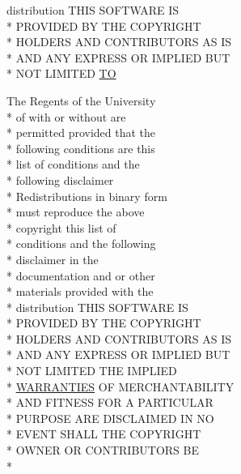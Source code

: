 \begin{DoxyCompactItemize}
distribution T\+H\+I\+S S\+O\+F\+T\+W\+A\+R\+E I\+S \\*
P\+R\+O\+V\+I\+D\+E\+D B\+Y T\+H\+E C\+O\+P\+Y\+R\+I\+G\+H\+T \\*
H\+O\+L\+D\+E\+R\+S A\+N\+D C\+O\+N\+T\+R\+I\+B\+U\+T\+O\+R\+S A\+S I\+S \\*
A\+N\+D A\+N\+Y E\+X\+P\+R\+E\+S\+S O\+R I\+M\+P\+L\+I\+E\+D B\+U\+T \\*
N\+O\+T L\+I\+M\+I\+T\+E\+D \hyperlink{_l_i_c_e_n_s_e_a57f5e47bdbaa2a03fa7895d50ba5e2d3}{T\+O}
\item 
The Regents of the University \\*
of with or without are \\*
permitted provided that the \\*
following conditions are this \\*
list of conditions and the \\*
following disclaimer \\*
Redistributions in binary form \\*
must reproduce the above \\*
copyright this list of \\*
conditions and the following \\*
disclaimer in the \\*
documentation and or other \\*
materials provided with the \\*
distribution T\+H\+I\+S S\+O\+F\+T\+W\+A\+R\+E I\+S \\*
P\+R\+O\+V\+I\+D\+E\+D B\+Y T\+H\+E C\+O\+P\+Y\+R\+I\+G\+H\+T \\*
H\+O\+L\+D\+E\+R\+S A\+N\+D C\+O\+N\+T\+R\+I\+B\+U\+T\+O\+R\+S A\+S I\+S \\*
A\+N\+D A\+N\+Y E\+X\+P\+R\+E\+S\+S O\+R I\+M\+P\+L\+I\+E\+D B\+U\+T \\*
N\+O\+T L\+I\+M\+I\+T\+E\+D T\+H\+E I\+M\+P\+L\+I\+E\+D \\*
\hyperlink{_l_i_c_e_n_s_e_a3f8645b457d8bdef4fd7c3549fc01039}{W\+A\+R\+R\+A\+N\+T\+I\+E\+S} O\+F M\+E\+R\+C\+H\+A\+N\+T\+A\+B\+I\+L\+I\+T\+Y \\*
A\+N\+D F\+I\+T\+N\+E\+S\+S F\+O\+R A P\+A\+R\+T\+I\+C\+U\+L\+A\+R \\*
P\+U\+R\+P\+O\+S\+E A\+R\+E D\+I\+S\+C\+L\+A\+I\+M\+E\+D I\+N N\+O \\*
E\+V\+E\+N\+T S\+H\+A\+L\+L T\+H\+E C\+O\+P\+Y\+R\+I\+G\+H\+T \\*
O\+W\+N\+E\+R O\+R C\+O\+N\+T\+R\+I\+B\+U\+T\+O\+R\+S B\+E \\*

\end{DoxyCompactItemize}
